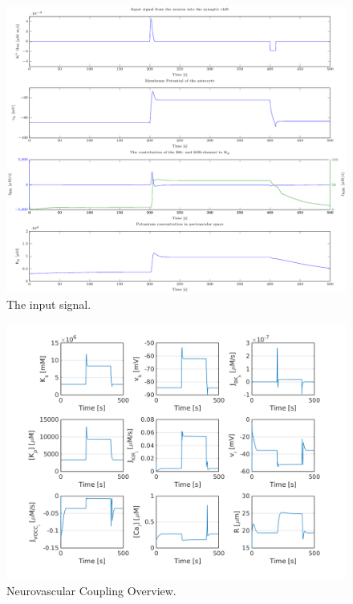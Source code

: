 	
	\begin{landscape}
			
		\begin{figure}[h!]
			\centering
			\includegraphics{figures/1_Input_signal.pdf}
			\caption{The input signal.}
			\label{fig:1IS}
		\end{figure}
		
		\begin{figure}[h!]
			\centering
			\includegraphics{new_figures/1 Neurovascular Coupling Overview.png}
			\caption{Neurovascular Coupling Overview.}
			\label{fig:1}
		\end{figure}		
		

\end{landscape}
